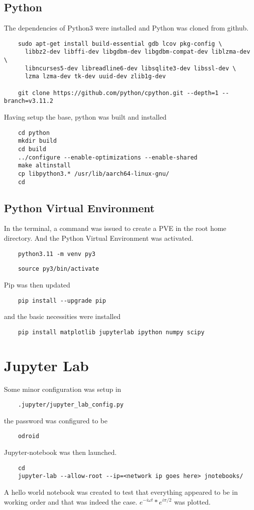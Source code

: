 \documentclass[11pt,letterpaper]{article}
\begin{document}
\subsection{Python}
The dependencies of Python3 were installed and Python was cloned from github.
\begin{verbatim}
    sudo apt-get install build-essential gdb lcov pkg-config \
      libbz2-dev libffi-dev libgdbm-dev libgdbm-compat-dev liblzma-dev \
      libncurses5-dev libreadline6-dev libsqlite3-dev libssl-dev \
      lzma lzma-dev tk-dev uuid-dev zlib1g-dev

    git clone https://github.com/python/cpython.git --depth=1 --branch=v3.11.2
\end{verbatim}
Having setup the base, python was built and installed
\begin{verbatim}
    cd python
    mkdir build
    cd build
    ../configure --enable-optimizations --enable-shared
    make altinstall
    cp libpython3.* /usr/lib/aarch64-linux-gnu/
    cd
\end{verbatim}
\subsection{Python Virtual Environment}
In the terminal, a command was issued to create a PVE in the root
home directory. And the Python Virtual Environment was activated.
\begin{verbatim}
    python3.11 -m venv py3
\end{verbatim}
\begin{verbatim}
    source py3/bin/activate
\end{verbatim}
Pip was then updated
\begin{verbatim}
    pip install --upgrade pip
\end{verbatim}
and the basic necessities were installed
\begin{verbatim}
    pip install matplotlib jupyterlab ipython numpy scipy
\end{verbatim}

\section{Jupyter Lab}
Some minor configuration was setup in
\begin{verbatim}
    .jupyter/jupyter_lab_config.py
\end{verbatim}
the password was configured to be
\begin{verbatim}
    odroid 
\end{verbatim}
Jupyter-notebook was then launched.
\begin{verbatim}
    cd
    jupyter-lab --allow-root --ip=<network ip goes here> jnotebooks/
\end{verbatim}
A hello world notebook was created to test that everything appeared to be in working order and that
was indeed the case. $ e^{-i\omega t}* e^{i\pi/2} $ was plotted.
\newpage
\end{document}
